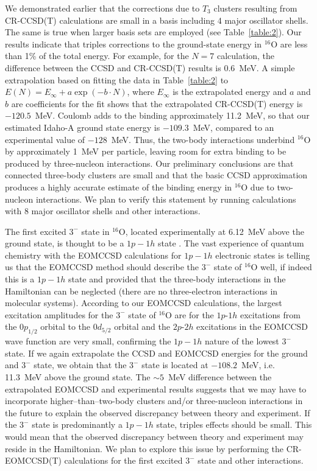 \documentclass[epj]{svjour}
\begin{document}
We demonstrated earlier \cite{kowalski04} that
the corrections due to $T_{3}$ clusters resulting from CR-CCSD(T) calculations
are small in a basis including 4 major oscillator shells.
The same is true when larger basis sets are employed (see Table~\ref{table:2}).
Our results indicate that triples
corrections to the ground-state energy in $^{16}$O are less
than 1\% of the total energy. For example, for the $N=7$ calculation, the difference
between the CCSD and CR-CCSD(T) results is 0.6~MeV. A simple
extrapolation based on fitting the data in Table~\ref{table:2} to
$E(N)=E_\infty+a\exp\left(-b\cdot N\right)$, where
$E_\infty$ is the extrapolated energy and $a$ and $b$ are coefficients for
the fit shows that the extrapolated CR-CCSD(T) energy is $-120.5$~MeV.
Coulomb adds to the binding approximately 11.2~MeV,
so that our estimated Idaho-A ground state energy is $-109.3$~MeV, compared
to an experimental value of $-128$~MeV. Thus,
the two-body interactions underbind $^{16}$O by approximately 1~MeV
per particle, leaving room for extra binding to be produced by
three-nucleon interactions. Our preliminary conclusions are that
connected three-body clusters are small and that the basic CCSD
approximation produces a
highly accurate estimate of the binding energy in $^{16}$O due to two-nucleon
interactions. We plan to verify this statement by running
calculations with 8 major oscillator shells and other interactions.

The first excited $3^-$ state in $^{16}$O, located experimentally at 6.12~MeV
above the ground state, is thought to be
a $1p-1h$ state \cite{wb92}. The vast experience of
quantum chemistry with the EOMCCSD calculations for
$1p-1h$ electronic states is telling us that the EOMCCSD method should
describe the $3^-$ state of $^{16}$O well, if indeed this is
a $1p-1h$ state and provided that the three-body
interactions in the Hamiltonian can be neglected (there are no three-electron
interactions in molecular systems). According to our EOMCCSD calculations,
the largest excitation amplitudes for the $3^-$ state of $^{16}$O
are for the $1p\mbox{-}1h$ excitations from
the $0p_{1/2}$ orbital to the $0d_{5/2}$ orbital and the $2p\mbox{-}2h$ excitations
in the EOMCCSD wave function are very small, confirming the
$1p-1h$ nature of the lowest $3^-$ state. If we again extrapolate the CCSD and
EOMCCSD energies for the ground and $3^-$ state,
we obtain that the $3^-$ state
is located at $-108.2$~MeV, i.e. 11.3~MeV above the ground state.
The $\sim 5$~MeV difference between the extrapolated EOMCCSD and
experimental results suggests that we may have to incorporate
higher--than--two-body clusters and/or three-nucleon interactions
in the future to explain the observed discrepancy between theory and
experiment. If the $3^-$ state is predominantly a $1p-1h$ state,
triples effects should be small. This would mean that
the observed discrepancy between theory and
experiment may reside in the Hamiltonian. We plan to explore this
issue by performing the CR-EOMCCSD(T) calculations for the
first excited $3^-$ state and other interactions.
\end{document}
